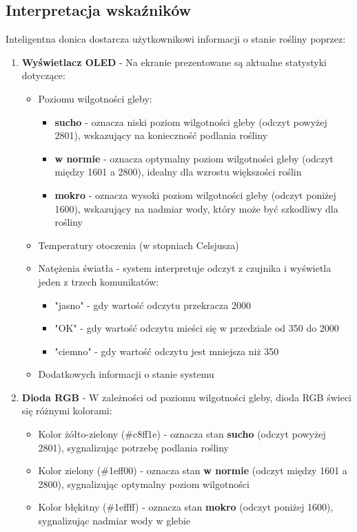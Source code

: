 \documentclass{article}
\begin{document}
\subsection{Interpretacja wskaźników}
Inteligentna donica dostarcza użytkownikowi informacji o stanie rośliny poprzez:
\begin{enumerate} 
     \item \textbf{Wyświetlacz OLED} - Na ekranie prezentowane są aktualne statystyki dotyczące: 
     \begin{itemize} 
         \item Poziomu wilgotności gleby:
             \begin{itemize}
                 \item \textbf{sucho} - oznacza niski poziom wilgotności gleby (odczyt powyżej 2801), wskazujący na konieczność podlania rośliny
                 \item \textbf{w normie} - oznacza optymalny poziom wilgotności gleby (odczyt między 1601 a 2800), idealny dla wzrostu większości roślin
                 \item \textbf{mokro} - oznacza wysoki poziom wilgotności gleby (odczyt poniżej 1600), wskazujący na nadmiar wody, który może być szkodliwy dla rośliny
             \end{itemize}
         \item Temperatury otoczenia (w stopniach Celsjusza) 
         \item Natężenia światła - system interpretuje odczyt z czujnika i wyświetla jeden z trzech komunikatów:
         \begin{itemize}
             \item "jasno" - gdy wartość odczytu przekracza 2000
             \item "OK" - gdy wartość odczytu mieści się w przedziale od 350 do 2000
             \item "ciemno" - gdy wartość odczytu jest mniejsza niż 350
         \end{itemize}
         \item Dodatkowych informacji o stanie systemu 
     \end{itemize} 
     
     \item \textbf{Dioda RGB} - W zależności od poziomu wilgotności gleby, dioda RGB świeci się różnymi kolorami: 
     \begin{itemize} 
         \item Kolor żółto-zielony (\#c8ff1e) - oznacza stan \textbf{sucho} (odczyt powyżej 2801), sygnalizując potrzebę podlania rośliny
         \item Kolor zielony (\#1eff00) - oznacza stan \textbf{w normie} (odczyt między 1601 a 2800), sygnalizując optymalny poziom wilgotności
         \item Kolor błękitny (\#1effff) - oznacza stan \textbf{mokro} (odczyt poniżej 1600), sygnalizując nadmiar wody w glebie
     \end{itemize} 
 \end{enumerate}
\end{document}
